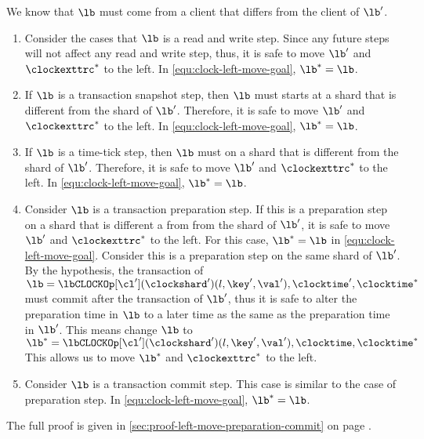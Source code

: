 \begin{proofsketch}
We know that \( \lb \) must come from a client that differs from the client of \( \lb' \).
\begin{enumerate}
\item Consider the cases that \( \lb \) is a read and write step.
Since any future steps will not affect any read and write step, 
thus, it is safe to move \( \lb' \) and \( \clockexttrc^*\) to the left.
In \cref{equ:clock-left-move-goal}, \( \lb^{*} = \lb \).
\item If \( \lb \) is a transaction snapshot step,
then \( \lb \) must starts at a shard that is different from the shard of \( \lb' \).
Therefore, it is safe to move \( \lb' \) and \( \clockexttrc^*\) to the left.
In \cref{equ:clock-left-move-goal}, \( \lb^{*} = \lb \).
\item If \( \lb \) is a time-tick step,
then \( \lb \) must on a shard that is different from the shard of \( \lb' \).
Therefore, it is safe to move \( \lb' \) and \( \clockexttrc^*\) to the left.
In \cref{equ:clock-left-move-goal}, \( \lb^{*} = \lb \).
\item Consider \( \lb \) is a transaction preparation step.
If this is a preparation step on a shard that is different a from from the shard of \( \lb' \),
it is safe to move \( \lb' \) and \( \clockexttrc^*\) to the left. 
For this case, \( \lb^{*} = \lb \) in \cref{equ:clock-left-move-goal}.
Consider this is a preparation step on the same shard of \( \lb' \).
By the hypothesis, the transaction of \( \lb = \lbCLOCKOp[\cl'](\clockshard'){(l,\key',\val'),\clocktime',\clocktime^{*}} \) 
must commit after the transaction of \( \lb' \),
thus it is safe to alter the preparation time in \( \lb \) to a later time as the same as the preparation time in \( \lb' \).
This means change \( \lb \)  to \( \lb^{*} = \lbCLOCKOp[\cl'](\clockshard'){(l,\key',\val'),\clocktime,\clocktime^{*}} \) 
This allows us to move \( \lb^{*} \) and \( \clockexttrc^*\) to the left. 
\item Consider \( \lb \) is a transaction commit step.
This case is similar to the case of preparation step.
In \cref{equ:clock-left-move-goal}, \( \lb^{*} = \lb \).
\end{enumerate}
The full proof is given in \cref{sec:proof-left-move-preparation-commit}
on page \pageref{sec:proof-left-move-preparation-commit}.
\end{proofsketch}
